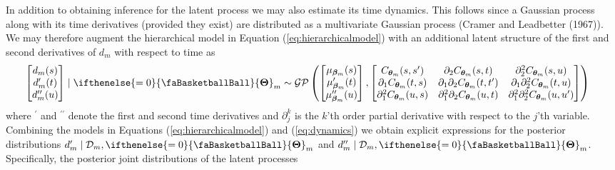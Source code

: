 \documentclass[
  11pt,
]{svjour3}
\theoremstyle{nonumberplain}
\begin{document}
In addition to obtaining inference for the latent process we may also
estimate its time dynamics. This follows since a Gaussian process along
with its time derivatives (provided they exist) are distributed as a
multivariate Gaussian process (Cramer and Leadbetter (1967)). We may
therefore augment the hierarchical model in Equation
(\ref{eq:hierarchicalmodel}) with an additional latent structure of the
first and second derivatives of \(d_m\) with respect to time as
\begin{align}
  \begin{bmatrix}d_m(s)\\ d^{\prime}_m(t)\\ d^{\prime\prime}_m(u)\end{bmatrix} \mid \ifthenelse{\value{bbsym4theta}=0}{\text{\faBasketballBall}}{\mathbf{\Theta}}_m &\sim \mathcal{GP}\left(\begin{bmatrix}\mu_{\bm{\beta}_m}(s)\\ \mu^{\prime}_{\bm{\beta}_m}(t)\\ \mu^{\prime\prime}_{\bm{\beta}_m}(u)\end{bmatrix}, \begin{bmatrix}C_{\bm{\theta}_m}(s, s^\prime) & \partial_2 C_{\bm{\theta}_m}(s, t) & \partial_2^2 C_{\bm{\theta}_m}(s, u)\\ \partial_1 C_{\bm{\theta}_m}(t, s) & \partial_1 \partial_2 C_{\bm{\theta}_m}(t, t^\prime) & \partial_1 \partial_2^2 C_{\bm{\theta}_m}(t, u)\\ \partial_1^2 C_{\bm{\theta}_m}(u, s) & \partial_1^2\partial_2 C_{\bm{\theta}_m}(u, t) & \partial_1^2 \partial_2^2 C_{\bm{\theta}_m}(u, u^\prime)\end{bmatrix}\right)
\label{eq:dynamics}
\end{align} where \(^\prime\) and \(^{\prime\prime}\) denote the first
and second time derivatives and \(\partial_j^k\) is the \(k\)'th order
partial derivative with respect to the \(j\)'th variable. Combining the
models in Equations (\ref{eq:hierarchicalmodel}) and (\ref{eq:dynamics})
we obtain explicit expressions for the posterior distributions
\(d^\prime_m \mid \mathcal{D}_m, \ifthenelse{\value{bbsym4theta}=0}{\text{\faBasketballBall}}{\mathbf{\Theta}}_m\)
and
\(d^{\prime \prime}_m \mid \mathcal{D}_m, \ifthenelse{\value{bbsym4theta}=0}{\text{\faBasketballBall}}{\mathbf{\Theta}}_m\).
Specifically, the posterior joint distributions of the latent processes
\end{document}
